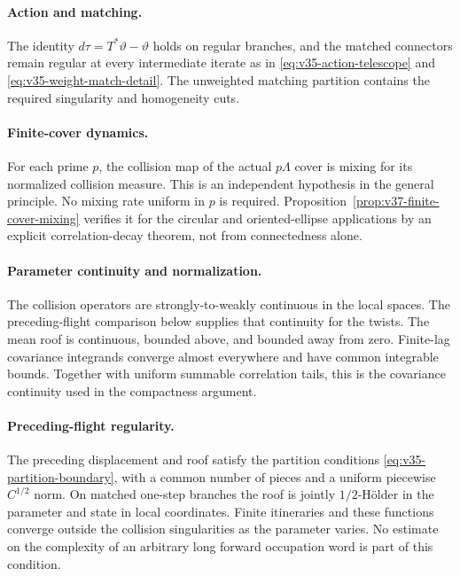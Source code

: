 \paragraph{Action and matching.}
The identity $d\tau=T^*\vartheta-\vartheta$ holds on regular branches,
and the matched connectors remain regular at every intermediate
iterate as in \eqref{eq:v35-action-telescope} and
\eqref{eq:v35-weight-match-detail}. The unweighted matching partition
contains the required singularity and homogeneity cuts.

\paragraph{Finite-cover dynamics.}
For each prime $p$, the collision map of the actual $p\Lambda$ cover
is mixing for its normalized collision measure. This is an independent
hypothesis in the general principle. No mixing rate uniform in $p$
is required. Proposition~\ref{prop:v37-finite-cover-mixing} verifies
it for the circular and oriented-ellipse applications by an explicit
correlation-decay theorem, not from connectedness alone.

\paragraph{Parameter continuity and normalization.}
The collision operators are strongly-to-weakly continuous in the
local spaces. The preceding-flight comparison below supplies that
continuity for the twists. The mean roof is continuous, bounded above,
and bounded away from zero. Finite-lag covariance integrands converge
almost everywhere and have common integrable bounds. Together with
uniform summable correlation tails, this is the covariance continuity
used in the compactness argument.

\paragraph{Preceding-flight regularity.}
The preceding displacement and roof satisfy the partition conditions
\eqref{eq:v35-partition-boundary}, with a common number of pieces and
a uniform piecewise $C^{1/2}$ norm. On matched one-step branches the
roof is jointly $1/2$-H\"older in the parameter and state in local
coordinates. Finite itineraries and these functions converge outside
the collision singularities as the parameter varies. No estimate on
the complexity of an arbitrary long forward occupation word is part
of this condition.

